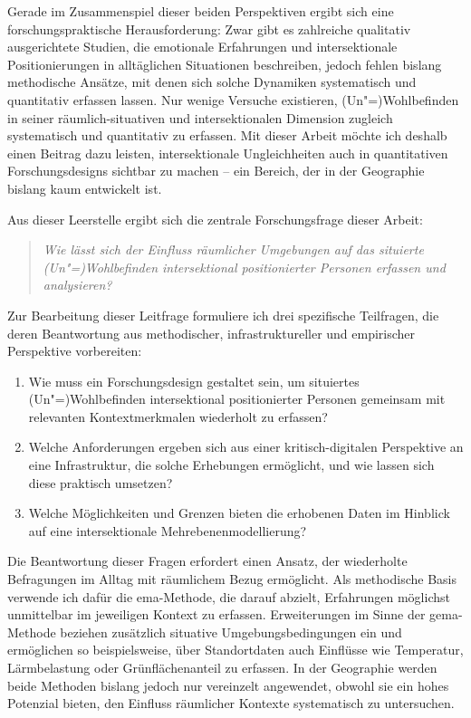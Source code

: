 Gerade im Zusammenspiel dieser beiden Perspektiven ergibt sich eine forschungspraktische Herausforderung: Zwar gibt es zahlreiche qualitativ ausgerichtete Studien, die emotionale Erfahrungen und intersektionale Positionierungen in alltäglichen Situationen beschreiben, jedoch fehlen bislang methodische Ansätze, mit denen sich solche Dynamiken systematisch und quantitativ erfassen lassen. Nur wenige Versuche existieren,  (Un\nobreakdash"=)Wohlbefinden in seiner räumlich-situativen und intersektionalen Dimension zugleich systematisch und quantitativ zu erfassen. Mit dieser Arbeit möchte ich deshalb einen Beitrag dazu leisten, intersektionale Ungleichheiten auch in quantitativen Forschungsdesigns sichtbar zu machen -- ein Bereich, der in der Geographie bislang kaum entwickelt ist.

\vspace{1em}

Aus dieser Leerstelle ergibt sich die zentrale Forschungsfrage dieser Arbeit:
\begin{quote}
\emph{Wie lässt sich der Einfluss räumlicher Umgebungen auf das situierte (Un\nobreakdash"=)Wohlbefinden intersektional positionierter Personen erfassen und analysieren?}
\end{quote}

Zur Bearbeitung dieser Leitfrage formuliere ich drei spezifische Teilfragen, die deren Beantwortung aus methodischer, infrastruktureller und empirischer Perspektive vorbereiten:

\begin{enumerate}
    \item Wie muss ein Forschungsdesign gestaltet sein, um situiertes (Un\nobreakdash"=)Wohlbefinden intersektional positionierter Personen gemeinsam mit relevanten Kontextmerkmalen wiederholt zu erfassen?
    \item Welche Anforderungen ergeben sich aus einer kritisch-digitalen Perspektive an eine Infrastruktur, die solche Erhebungen ermöglicht, und wie lassen sich diese praktisch umsetzen?
    \item Welche Möglichkeiten und Grenzen bieten die erhobenen Daten im Hinblick auf eine intersektionale Mehrebenenmodellierung?
\end{enumerate}

Die Beantwortung dieser Fragen erfordert einen Ansatz, der wiederholte Befragungen im Alltag mit räumlichem Bezug ermöglicht. Als methodische Basis verwende ich dafür die \gls{ema}-Methode, die darauf abzielt, Erfahrungen möglichst unmittelbar im jeweiligen Kontext zu erfassen. Erweiterungen im Sinne der \gls{gema}-Methode beziehen zusätzlich situative Umgebungsbedingungen ein und ermöglichen so beispielsweise, über Standortdaten auch Einflüsse wie Temperatur, Lärmbelastung oder Grünflächenanteil zu erfassen. In der Geographie werden beide Methoden bislang jedoch nur vereinzelt angewendet, obwohl sie ein hohes Potenzial bieten, den Einfluss räumlicher Kontexte systematisch zu untersuchen.

